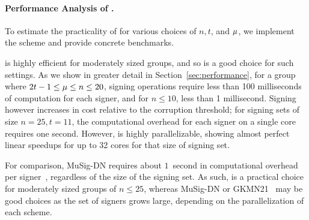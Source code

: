\paragraph{\bf Performance Analysis of \glitter.}
To estimate the practicality of \glitter for various choices of $n, t$, and $\mu$,
we implement the scheme and provide concrete benchmarks.

\glitter is highly efficient for moderately sized groups,
and so is a good choice for such settings.
As we show in greater detail in Section~\ref{sec:performance},
for a group where $2t-1 \leq \mu \le n \leq 20$,
\glitter signing operations require less than 100 milliseconds of computation for each signer, and for $n \le 10$, less than 1 millisecond.
Signing however increases in cost relative to the corruption threshold;
for signing sets of size $n=25, t=11$, the
computational overhead for each signer on a single core requires one second.
However, \glitter is highly parallelizable, showing almost perfect linear speedups for up to 32 cores for that size of signing set.

For comparison,
MuSig-DN requires about $1$~second in computational overhead per signer~\cite{NickRSW20},
regardless of the size of the signing set.
As such, \glitter is a practical choice for moderately sized groups of $n \leq 25$,
whereas MuSig-DN or GKMN21~\cite{GarillotKMN21} may be good choices as the set of signers grows large,
depending on the parallelization of each scheme.

